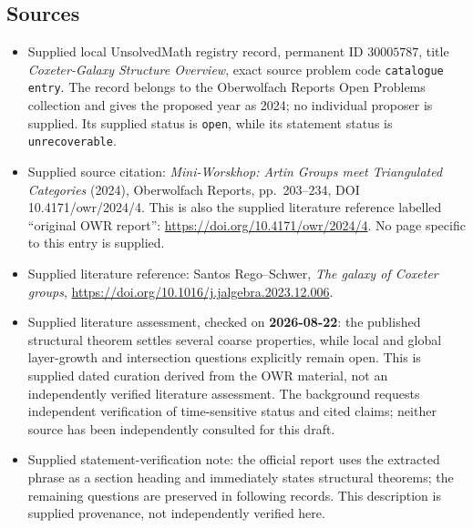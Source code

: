 \documentclass[11pt]{article}
\begin{document}
\subsection{Sources}
\begin{itemize}
\item Supplied local UnsolvedMath registry record, permanent ID \(30005787\), title \emph{Coxeter-Galaxy Structure Overview}, exact source problem code \texttt{catalogue entry}. The record belongs to the Oberwolfach Reports Open Problems collection and gives the proposed year as 2024; no individual proposer is supplied. Its supplied status is \texttt{open}, while its statement status is \texttt{unrecoverable}.
\item Supplied source citation: \emph{Mini-Worskhop: Artin Groups meet Triangulated Categories} (2024), Oberwolfach Reports, pp.\ 203--234, DOI 10.4171/owr/2024/4. This is also the supplied literature reference labelled ``original OWR report'': \url{https://doi.org/10.4171/owr/2024/4}. No page specific to this entry is supplied.
\item Supplied literature reference: Santos Rego--Schwer, \emph{The galaxy of Coxeter groups}, \url{https://doi.org/10.1016/j.jalgebra.2023.12.006}.
\item Supplied literature assessment, checked on \textbf{2026-08-22}: the published structural theorem settles several coarse properties, while local and global layer-growth and intersection questions explicitly remain open. This is supplied dated curation derived from the OWR material, not an independently verified literature assessment. The background requests independent verification of time-sensitive status and cited claims; neither source has been independently consulted for this draft.
\item Supplied statement-verification note: the official report uses the extracted phrase as a section heading and immediately states structural theorems; the remaining questions are preserved in following records. This description is supplied provenance, not independently verified here.
\end{itemize}
\end{document}
